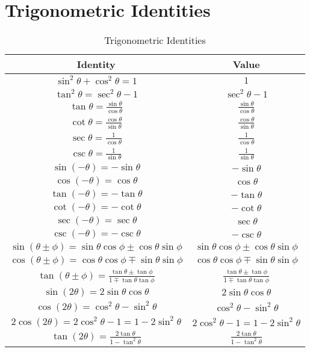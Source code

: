 \section{Trigonometric Identities}\label{app:trigIdentities}
\begin{table}[h!]
    \centering
    \begin{tabular}{|c|c|}
        \hline
        \textbf{Identity} & \textbf{Value} \\
        \hline
        $\sin^2\theta + \cos^2\theta = 1$ & $1$ \\
        $\tan^2\theta = \sec^2\theta - 1$ & $\sec^2\theta - 1$ \\
        $\tan\theta = \frac{\sin\theta}{\cos\theta}$ & $\frac{\sin\theta}{\cos\theta}$ \\
        $\cot\theta = \frac{\cos\theta}{\sin\theta}$ & $\frac{\cos\theta}{\sin\theta}$ \\
        $\sec\theta = \frac{1}{\cos\theta}$ & $\frac{1}{\cos\theta}$ \\
        $\csc\theta = \frac{1}{\sin\theta}$ & $\frac{1}{\sin\theta}$ \\
        $\sin(-\theta) = -\sin\theta$ & $-\sin\theta$ \\
        $\cos(-\theta) = \cos\theta$ & $\cos\theta$ \\
        $\tan(-\theta) = -\tan\theta$ & $-\tan\theta$ \\
        $\cot(-\theta) = -\cot\theta$ & $-\cot\theta$ \\
        $\sec(-\theta) = \sec\theta$ & $\sec\theta$ \\
        $\csc(-\theta) = -\csc\theta$ & $-\csc\theta$ \\
        $\sin(\theta \pm \phi) = \sin\theta\cos\phi \pm \cos\theta\sin\phi$ & $\sin\theta\cos\phi \pm \cos\theta\sin\phi$ \\
        $\cos(\theta \pm \phi) = \cos\theta\cos\phi \mp \sin\theta\sin\phi$ & $\cos\theta\cos\phi \mp \sin\theta\sin\phi$ \\
        $\tan(\theta \pm \phi) = \frac{\tan\theta \pm \tan\phi}{1 \mp \tan\theta\tan\phi}$ & $\frac{\tan\theta \pm \tan\phi}{1 \mp \tan\theta\tan\phi}$ \\
        $\sin(2\theta) = 2\sin\theta\cos\theta$ & $2\sin\theta\cos\theta$ \\
        $\cos(2\theta) = \cos^2\theta - \sin^2\theta$ & $\cos^2\theta - \sin^2\theta$ \\
        $2\cos(2\theta) = 2\cos^2\theta - 1 = 1 - 2\sin^2\theta$ & $2\cos^2\theta - 1 = 1 - 2\sin^2\theta$ \\
        $\tan(2\theta) = \frac{2\tan\theta}{1 - \tan^2\theta}$ & $\frac{2\tan\theta}{1 - \tan^2\theta}$ \\
        \hline
    \end{tabular}
    \caption{Trigonometric Identities}
    \label{tab:trigIdentities}
\end{table}